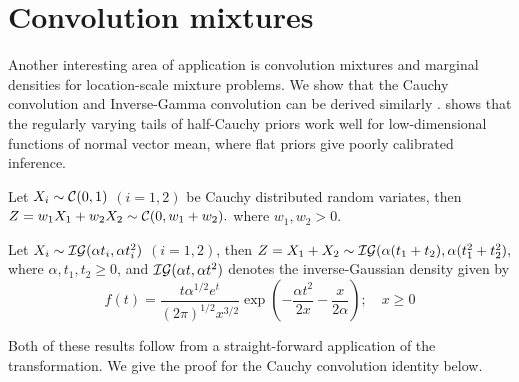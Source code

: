 \documentclass[lineno]{biometrika}
\begin{document}

\section{Convolution mixtures}
\label{sec:convolutions}

Another interesting area of application is convolution mixtures and marginal densities for location-scale mixture problems. We show that the Cauchy
convolution \citep{pillai2015unexpected} and Inverse-Gamma convolution can be derived similarly \citep{polson_halfcauchy_2012}. \citet{bhadra_default_2016} shows that the regularly varying tails of half-Cauchy priors work well for low-dimensional functions of normal
vector mean, where flat priors give poorly calibrated inference. 
\begin{lemma}
  Let $X_i \sim \mathcal{C}(0,1)$ $(i = 1, 2)$ be Cauchy distributed random variates, then $Z = w_1 X_1 + w_2 X_2 \sim \mathcal{C}( 0, w_1 + w_2).$ where $w_1,w_2 > 0$.
\end{lemma}
\begin{lemma}
  Let $X_i \sim \mathcal{IG}(\alpha t_i, \alpha t_i^2)$ $(i = 1, 2)$, then $Z = X_1 + X_2 \sim \mathcal{IG}(\alpha (t_1 + t_2), \alpha (t_1^2+t_2^2),$ where $\alpha, t_1, t_2 \geq 0$, and $\mathcal{IG}(\alpha t, \alpha t^2)$ denotes the inverse-Gaussian density given by
\[
    f(t) = \frac{t \alpha^{1/2} e^t}{(2 \pi)^{1/2} x^{3/2}} 
    \exp\left( -\frac{\alpha t^2}{2x} - \frac{x}{2\alpha} \right); \quad x \geq 0
\]
\end{lemma}

Both of these results follow from a straight-forward application of the \CS{} 
transformation. We give the proof for the Cauchy convolution identity below.
\end{document}
